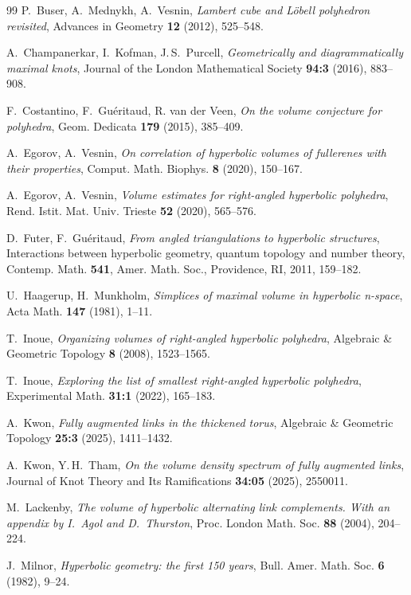 \documentclass{amsart}
\begin{document}
\begin{thebibliography}{99}
P.~Buser, A.~Mednykh, A.~Vesnin, \textit{Lambert cube and L\"obell polyhedron revisited}, Advances in Geometry \textbf{12} (2012), 525--548.

A.~Champanerkar, I.~Kofman, J.\,S.~Purcell,
\textit{Geometrically and diagrammatically maximal knots},
Journal of the London Mathematical Society \textbf{94:3} (2016), 883--908.

F.~Costantino, F.~Gu\'eritaud, R. van der Veen, \textit{On the volume conjecture for polyhedra}, Geom. Dedicata \textbf{179} (2015), 385--409.

A.~Egorov, A.~Vesnin, \textit{On correlation of hyperbolic volumes of fullerenes with their properties}, Comput. Math. Biophys. \textbf{8} (2020), 150--167.

A.~Egorov, A.~Vesnin, \textit{Volume estimates for right-angled hyperbolic polyhedra},
Rend. Istit. Mat. Univ. Trieste \textbf{52} (2020), 565--576.

D.~Futer, F.~Gu\'eritaud, \textit{From angled triangulations to hyperbolic structures}, Interactions between hyperbolic geometry, quantum topology and number theory, Contemp. Math. \textbf{541}, Amer. Math. Soc., Providence, RI, 2011, 159--182.

U.~Haagerup, H.~Munkholm, \textit{Simplices of maximal volume in hyperbolic n-space},
Acta Math. \textbf{147} (1981), 1--11.

T.~Inoue, \textit{Organizing volumes of right-angled hyperbolic polyhedra}, Algebraic \& Geometric Topology \textbf{8} (2008), 1523--1565.

T.~Inoue, \textit{Exploring the list of smallest right-angled hyperbolic polyhedra}, Experimental Math. \textbf{31:1} (2022), 165--183.

A.~Kwon, \textit{Fully augmented links in the thickened torus}, Algebraic \& Geometric Topology \textbf{25:3} (2025), 1411--1432.

A.~Kwon, Y.\,H.~Tham, \textit{On the volume density spectrum of fully augmented links}, Journal of Knot Theory and Its Ramifications \textbf{34:05} (2025), 2550011.

M.~Lackenby, \textit{The volume of hyperbolic alternating link complements. With an appendix by I.~Agol and D.~Thurston}, Proc. London Math. Soc. \textbf{88} (2004), 204--224.

J.~Milnor, \textit{Hyperbolic geometry: the first 150 years},
Bull. Amer. Math. Soc. \textbf{6} (1982), 9--24.


\end{thebibliography}
\end{document}
